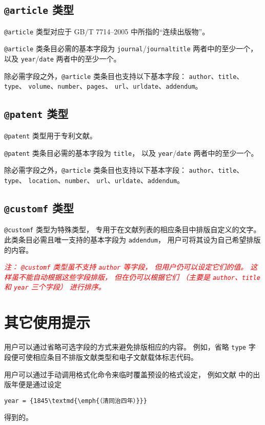 \documentclass[UTF8, fancyhdr, hyperref]{ctexart}
\newcommand{\myemph}[1]{\emph{\textcolor{red}{#1}}}
\begin{document}
\subsection{\texttt{@article} 类型}

\verb|@article| 类型对应于 GB/T 7714--2005 中所指的“连续出版物”。

\verb|@article| 类条目必需的基本字段为
\verb|journal|/\verb|journaltitle| 两者中的至少一个，
以及 \verb|year|/\verb|date| 两者中的至少一个。

除必需字段之外，\verb|@article| 类条目也支持以下基本字段：
\verb|author|、\verb|title|、\verb|type|、
\verb|volume|、\verb|number|、\verb|pages|、
\verb|url|、\verb|urldate|、\verb|addendum|。

\subsection{\texttt{@patent} 类型}

\verb|@patent| 类型用于专利文献。

\verb|@patent| 类条目必需的基本字段为 \verb|title|，
以及 \verb|year|/\verb|date| 两者中的至少一个。

除必需字段之外，\verb|@article| 类条目也支持以下基本字段：
\verb|author|、\verb|title|、\verb|type|、
\verb|location|、\verb|number|、
\verb|url|、\verb|urldate|、\verb|addendum|。

\subsection{\texttt{@customf} 类型}

\verb|@customf| 类型为特殊类型，
专用于在文献列表的相应条目中排版自定义的文字。
此类条目必需且唯一支持的基本字段为 \verb|addendum|，
用户可将其设为自己希望排版的内容。

\myemph{%
	注：
	\texttt{@customf} 类型虽不支持 \texttt{author} 等字段，
	但用户仍可以设定它们的值。
	这样虽不能自动根据这些字段排版，
	但在仍可以根据它们
	（主要是 \texttt{author}、\texttt{title} 和 \texttt{year} 三个字段）
	进行排序。 %
}

\section{其它使用提示}

用户可以通过省略可选字段的方式来避免排版相应的内容。
例如，省略 \verb|type| 字段便可使相应条目不排版文献类型和电子文献载体标志代码。

用户可以通过手动调用格式化命令来临时覆盖预设的格式设定，
例如文献 \parencite{1-7} 中的出版年便是通过设定
\begin{Verbatim}[frame = single]
year = {1845\textmd{\emph{（清同治四年）}}}
\end{Verbatim}
得到的。
\end{document}
